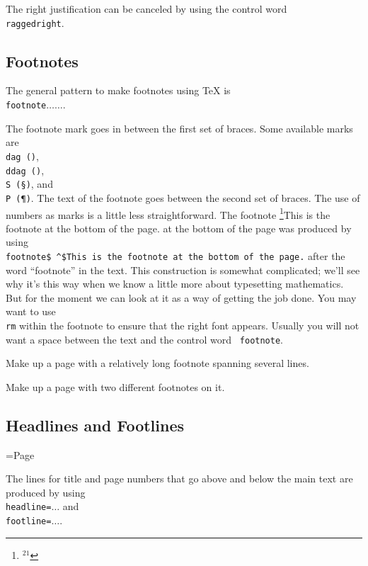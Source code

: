 The right justification can be canceled by using the 
control word {\tt \\raggedright}. 

\subsection{Footnotes} 

The general pattern to make footnotes using \TeX{} is 
{\tt \\footnote\lb$\ldots$\rb\lb$\ldots$\rb}\null. 

The footnote mark goes in between the first set of braces.  Some 
available marks are {\tt \\dag (\dag)}, {\tt \\ddag (\ddag)}, {\tt \\S 
(\S)}, and {\tt \\P (\P)}\null.  The text of the footnote 
goes between the second set of braces. The use of numbers as 
marks is a little less straightforward. The footnote%
\footnote{${}^{21}$}{This is the footnote at the bottom of the page.} 
at the bottom of the page was produced by using {\tt \\footnote\lb\$\lb 
\rb\^{}\rb\$\rb\lb This is the footnote at the 
bottom of the page.\rb}  after the word ``footnote'' in the 
text. This construction is somewhat complicated; we'll see why 
it's this way when we know a little more about typesetting 
mathematics. But for the moment we can look at it as a way of 
getting the job done. You may want to use {\tt \\rm} within the 
footnote to ensure that the right font appears. Usually you will 
not want a space between the text and the control word {\tt 
footnote}. 

\exercise Make up a page with a relatively long footnote spanning 
several lines. 

\exercise Make up a page with two different footnotes on it. 

\subsection{Headlines and Footlines} 

\headline={\hfil \tenrm Page \the\pageno} %

The lines for title and page numbers that go above and below the 
main text are produced by using {\tt \\headline=\lb$\dots$\rb} 
and {\tt \\footline=\lb$\dots$\rb}\null. 

